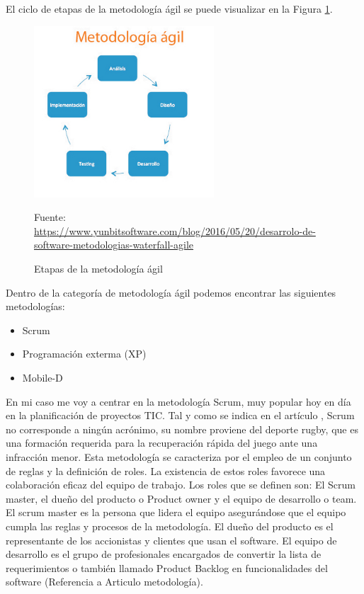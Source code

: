 El ciclo de etapas de la metodología ágil se puede visualizar en la Figura \ref{fig:etapas_agil}.

\begin{figure}[h]
    \centering
    \includegraphics[width=0.6\textwidth]{imagenes/03_Planificacion/meto_agil.jpg}
    \label{fig:etapas_agil}
    \begin{center}
        Fuente: \url{https://www.yunbitsoftware.com/blog/2016/05/20/desarrolo-de-software-metodologias-waterfall-agile}
    \end{center}
    \caption{Etapas de la metodología ágil}
\end{figure}


Dentro de la categoría de metodología ágil podemos encontrar las siguientes metodologías:

\begin{itemize}
    \item Scrum
    \item Programación exterma (XP)
    \item Mobile-D
\end{itemize}

En mi caso me voy a centrar en la metodología Scrum, muy popular hoy en día en la planificación de proyectos TIC. Tal y como se indica en el artículo \cite{RefWorks:RefID:11-cevallos2018metodologias}, Scrum no corresponde a ningún acrónimo, su nombre proviene del deporte rugby, que es una formación requerida para la recuperación rápida del juego ante una infracción menor. Esta metodología se caracteriza por el empleo de un conjunto de reglas y la definición de roles. La existencia de estos roles favorece una colaboración eficaz del equipo de trabajo. 
Los roles que se definen son: El Scrum master, el dueño del producto o Product owner y el equipo de desarrollo o team. El scrum master es la persona que lidera el equipo asegurándose que el equipo cumpla las reglas y procesos de la metodología. El dueño del producto es el representante de los accionistas y clientes que usan el software. El equipo de desarrollo es el grupo de profesionales encargados de convertir la lista de requerimientos o también llamado Product Backlog en funcionalidades del software (Referencia a Articulo metodología).

